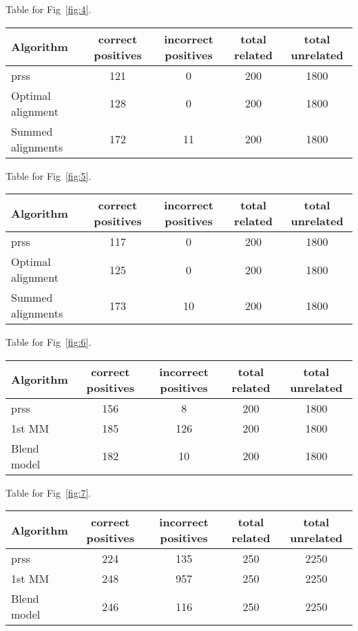 \documentclass[a4paper,10pt,oneside]{article}
\begin{document}
Table for Fig~\ref{fig:4}.
\begin{tabular}{|l||c|c|c|c|} \hline
Algorithm & correct positives & incorrect positives & total related & total unrelated \\ \hline
prss & 121 & 0 & 200 & 1800 \\ 
Optimal alignment & 128 & 0 & 200 & 1800 \\ 
Summed alignments & 172 & 11 & 200 & 1800 \\ 
\hline \end{tabular}

Table for Fig~\ref{fig:5}.
\begin{tabular}{|l||c|c|c|c|} \hline
Algorithm & correct positives & incorrect positives & total related & total unrelated \\ \hline
prss & 117 & 0 & 200 & 1800 \\ 
Optimal alignment & 125 & 0 & 200 & 1800 \\ 
Summed alignments & 173 & 10 & 200 & 1800 \\ 
\hline \end{tabular}

Table for Fig~\ref{fig:6}.
\begin{tabular}{|l||c|c|c|c|} \hline
Algorithm & correct positives & incorrect positives & total related & total unrelated \\ \hline
prss & 156 & 8 & 200 & 1800 \\ 
1st MM & 185 & 126 & 200 & 1800 \\ 
Blend model & 182 & 10 & 200 & 1800 \\ 
\hline \end{tabular}

Table for Fig~\ref{fig:7}.
\begin{tabular}{|l||c|c|c|c|} \hline
Algorithm & correct positives & incorrect positives & total related & total unrelated \\ \hline
prss & 224 & 135 & 250 & 2250 \\ 
1st MM  & 248 & 957 & 250 & 2250 \\ 
Blend model & 246 & 116 & 250 & 2250 \\ 
\hline \end{tabular}




\begin{figure}[htb]
\centerline{}
\caption{\label{fig:1}}
\end{figure}

\begin{figure}[htb]
\centerline{}
\caption{\label{fig:2}}
\end{figure}
\end{document}

